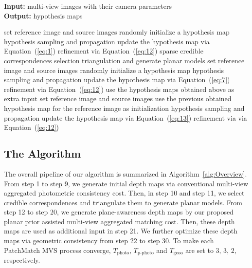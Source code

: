 \documentclass[letterpaper]{article} %
\begin{document}
\begin{algorithm}[t]
	\caption{Planar Prior Assisted PatchMatch MVS}   
	\label{alg:Overview}
	{\bf Input:} multi-view images with their camera parameters \\
	{\bf Output:} hypothesis maps 
	\begin{algorithmic}[1] 
		\STATE set reference image and source images
		\STATE randomly initialize a hypothesis map
		\STATE hypothesis sampling and propagation
		\STATE update the hypothesis map via Equation~(\ref{eq:1})
		\STATE refinement via Equation~(\ref{eq:12})
		\ENDFOR
		\ENDFOR
		\STATE sparse credible correspondences selection
		\STATE triangulation and generate planar models
		\STATE set reference image and source images
		\STATE randomly initialize a hypothesis map
		\STATE hypothesis sampling and propagation
		\STATE update the hypothesis map via Equation~(\ref{eq:7})
		\STATE refinement via Equation~(\ref{eq:12})
		\ENDFOR
		\ENDFOR
		\STATE use the hypothesis maps obtained above as extra input
		\STATE set reference image and source images
		\STATE use the previous obtained hypothesis map for the reference image as initialization
		\STATE hypothesis sampling and propagation
		\STATE update the hypothesis map via Equation~(\ref{eq:13})
		\STATE refinement via via Equation~(\ref{eq:12})
		\ENDFOR 
		\ENDFOR
	\end{algorithmic} 
\end{algorithm}

\subsection{The Algorithm}

The overall pipeline of our algorithm is summarized in Algorithm~\ref{alg:Overview}. From step 1 to step 9, we generate initial depth maps via conventional multi-view aggregated photometric consistency cost. Then, in step 10 and step 11, we select credible correspondences and triangulate them to generate planar models. From step 12 to step 20, we generate plane-awareness depth maps by our proposed planar prior assisted multi-view aggregated matching cost. Then, these depth maps are used as additional input in step 21. We further optimize these depth maps via geometric consistency from step 22 to step 30. To make each PatchMatch MVS process converge, $T_\text{photo}$, $T_\text{p-photo}$ and $T_\text{geoo}$ are set to 3, 3, 2, respectively. 
\end{document}
